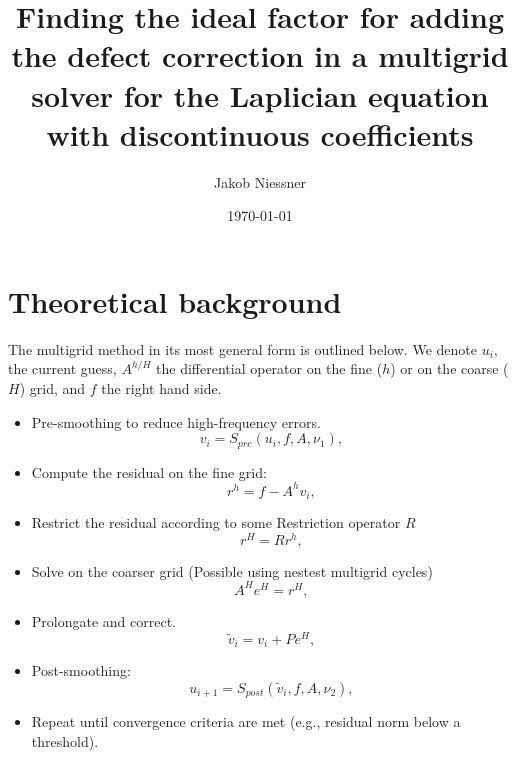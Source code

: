 \documentclass[12pt, a4paper]{article}
\title{Finding the ideal factor for adding the defect correction in a multigrid solver for the Laplician equation with discontinuous coefficients}
\author{Jakob Niessner}
\date{\today}
\begin{document}
\maketitle

\newpage

\tableofcontents

\newpage

\section{Theoretical background}

The multigrid method in its most general form is outlined below. We denote $u_i,$ the current guess, $A^{h/H}$  the differential operator on the fine ($h$) or on the coarse ($H$) grid, and $f$  the right hand side.

\begin{algorithm}[H]


\caption{Multigrid cycle}

\vspace{0.4cm}
\begin{itemize}
    \item Pre-smoothing to reduce high-frequency errors.
     \begin{equation}
       v_i = S_{\textit{pre}}(u_i, f, A, \nu_1),
     \end{equation}
    \item Compute the residual on the fine grid:
        \begin{equation}
          r^h = f - A^h v_i,
        \end{equation}
        \item Restrict the residual according to some Restriction operator $R$
        \begin{equation}
          r^H = R r^h,
        \end{equation}
        \item Solve on the coarser grid (Possible using nestest multigrid cycles)
        \begin{equation}
          A^H e^H = r^H,
        \end{equation}
        \item Prolongate and correct. 
          \begin{equation}
            \tilde{v}_i = v_i + P e^H,
         \end{equation}
        \item Post-smoothing:
          \begin{equation}
            u_{i+1} = S_{\textit{post}}(\tilde{v}_i, f, A, \nu_2),
          \end{equation}
    \item Repeat until convergence criteria are met (e.g., residual norm below a threshold).
\end{itemize}

\end{algorithm}
\end{document}
